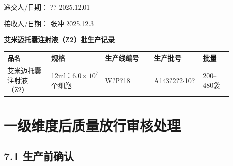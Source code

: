 \documentclass[UTF8,10pt,a4paper,fontset=fandol]{ctexart}
\newcommand{\fieldvalue}[1]{#1}
\newcommand{\handwritten}[1]{#1}
\begin{document}
\vspace{0.5em}

\noindent
递交人/日期：
\fieldvalue{\handwritten{??}}
\quad
\fieldvalue{\handwritten{2025.12.01}}

\vspace{0.5em}

\noindent
接收人/日期：
\fieldvalue{\handwritten{张冲}}
\quad
\fieldvalue{\handwritten{2025.12.3}}

\newpage

\begin{center}
\textbf{艾米迈托囊注射液（Z2）批生产记录}
\end{center}

\begin{tabular}{|p{0.18\linewidth}|p{0.22\linewidth}|p{0.20\linewidth}|p{0.20\linewidth}|p{0.12\linewidth}|}
\hline
品名 & 规格 & 生产线编号 & 生产批号 & 批量\\
\hline
\fieldvalue{艾米迈托囊注射液（Z2）} &
\fieldvalue{12ml：$6.0\times10^{7}$个细胞} &
\fieldvalue{\handwritten{W?P?18}} &
\fieldvalue{\handwritten{A143?2?2-10?}} &
\fieldvalue{200--480袋}\\
\hline
\end{tabular}

\section{一级维度后质量放行审核处理}

\subsection{7.1 生产前确认}
\end{document}
